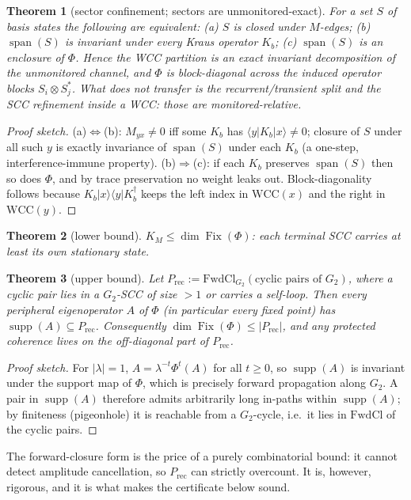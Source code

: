 \documentclass[11pt]{article}
\providecommand{\ket}[1]{|#1\rangle}
\providecommand{\bra}[1]{\langle #1|}
\newcommand{\Fix}{\operatorname{Fix}}
\newcommand{\supp}{\operatorname{supp}}
\newcommand{\Prec}{P_{\mathrm{rec}}}
\newcommand{\GG}{G_2}
\theoremstyle{plain}
\newtheorem{theorem}{Theorem}
\theoremstyle{definition}
\begin{document}
\begin{theorem}[sector confinement; sectors are unmonitored-exact]\label{thm:t1}
For a set $S$ of basis states the following are equivalent: (a) $S$ is closed
under $M$-edges; (b) $\operatorname{span}(S)$ is invariant under every Kraus
operator $K_b$; (c) $\operatorname{span}(S)$ is an enclosure of $\Phi$. Hence the
WCC partition is an \emph{exact} invariant decomposition of the unmonitored
channel, and $\Phi$ is block-diagonal across the induced operator blocks
$S_i\otimes S_j^{*}$. What does \emph{not} transfer is the recurrent/transient
split and the SCC refinement inside a WCC: those are monitored-relative.
\end{theorem}
\begin{proof}[Proof sketch]
(a)$\Leftrightarrow$(b): $M_{yx}\neq0$ iff some $K_b$ has
$\bra{y}K_b\ket{x}\neq0$; closure of $S$ under all such $y$ is exactly invariance
of $\operatorname{span}(S)$ under each $K_b$ (a one-step, interference-immune
property). (b)$\Rightarrow$(c): if each $K_b$ preserves $\operatorname{span}(S)$
then so does $\Phi$, and by trace preservation no weight leaks out. Block-diagonality
follows because $K_b\ket{x}\bra{y}K_b^\dagger$ keeps the left index in
$\mathrm{WCC}(x)$ and the right in $\mathrm{WCC}(y)$.
\end{proof}

\begin{theorem}[lower bound]\label{thm:t2}
$K_M \le \dim\Fix(\Phi)$: each terminal SCC carries at least its own stationary
state.
\end{theorem}

\begin{theorem}[upper bound]\label{thm:t3}
Let $\Prec := \mathrm{FwdCl}_{\GG}(\text{cyclic pairs of }\GG)$, where a
\emph{cyclic pair} lies in a $\GG$-SCC of size $>1$ or carries a self-loop. Then
every peripheral eigenoperator $A$ of $\Phi$ (in particular every fixed point)
has $\supp(A)\subseteq\Prec$. Consequently
$\dim\Fix(\Phi)\le|\Prec|$, and any protected coherence lives on the
off-diagonal part of $\Prec$.
\end{theorem}
\begin{proof}[Proof sketch]
For $|\lambda|=1$, $A=\lambda^{-t}\Phi^t(A)$ for all $t\ge 0$, so
$\supp(A)$ is invariant under the support map of $\Phi$, which is precisely
forward propagation along $\GG$. A pair in $\supp(A)$ therefore admits
arbitrarily long in-paths within $\supp(A)$; by finiteness (pigeonhole) it is
reachable from a $\GG$-cycle, i.e.\ it lies in $\mathrm{FwdCl}$ of the cyclic
pairs.
\end{proof}
The forward-closure form is the price of a purely combinatorial bound: it cannot
detect amplitude cancellation, so $\Prec$ can strictly overcount. It is,
however, rigorous, and it is what makes the certificate below sound.
\end{document}
